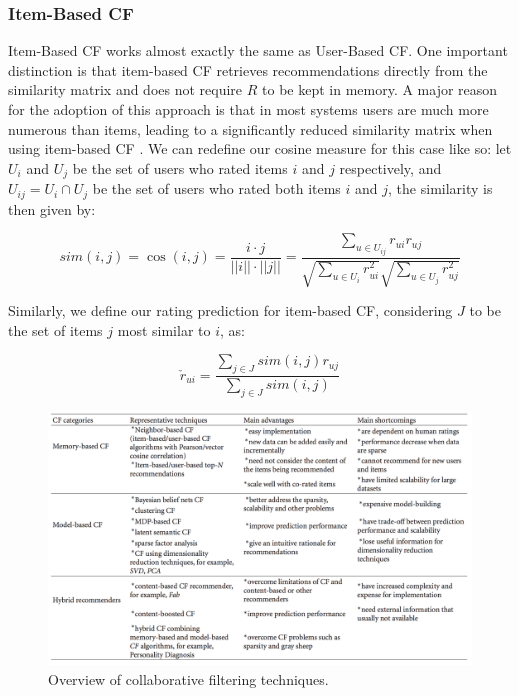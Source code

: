 \documentclass[cic,tc,english]{iiufrgs}
\begin{document}
\subsubsection{Item-Based CF}
Item-Based CF works almost exactly the same as User-Based CF. One important distinction is that item-based CF retrieves recommendations directly from the similarity matrix and does not require $R$ to be kept in memory. A major reason for the adoption of this approach is that in most systems users are much more numerous than items, leading to a significantly reduced similarity matrix when using item-based CF \cite{Sarwar2001}. We can redefine our cosine measure for this case like so: let $U_i$ and $U_j$ be the set of users who rated items $i$ and $j$ respectively, and $U_{ij} = U_i \cap U_j$ be the set of users who rated both items $i$ and $j$, the similarity is then given by:


$$sim( i,  j) = \cos( i,  j) = \frac { i \cdot  j}{|| i|| \cdot || j||} = \frac{\sum_{u \in U_{ij}} r_{ui}r_{uj}}{\sqrt{\sum_{u \in U_i} r_{ui}^2}\sqrt{\sum_{u \in U_j} r_{uj}^2}}$$

Similarly, we define our rating prediction for item-based CF, considering $J$ to be the set of items $j$ most similar to $i$, as:

$$
\check{r}_{ui} = \frac{\sum_{j \in J} sim(i, j)r_{uj}}{\sum_{j \in J} sim(i, j)}
$$

\begin{figure}
    \caption{Overview of collaborative filtering techniques.}
    \begin{center}
        \includegraphics[width=35em]{cf-comparison}
    \end{center}
    \label{fig:cf-comparison}
\end{figure}
\end{document}
